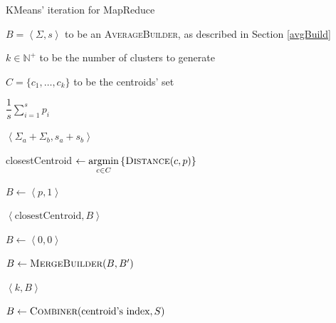 \documentclass[parskip=full]{report}
\begin{document}
\begin{algorithm}
	\caption{KMeans' iteration for MapReduce}
	\label{algo:kmeans-reducer}
	\begin{algorithmic}[1]
		\Require $B = \left\langle \Sigma, s\right\rangle$ to be an 
		\textsc{AverageBuilder}, as described in Section \ref{avgBuild}
		
		\Require $k \in \mathbb{N}^+$ to be the number of clusters to generate
		
		\Require $C = \{c_1, \dots, c_k\}$ to be the centroids' set
		
		 
		\State \Return $\dfrac{1}{s}\sum_{i = 1}^{s} p_i$
		\EndProcedure
		
		\vspace{.25cm}
		
		 
		\State \Return $\left\langle \Sigma_a + \Sigma_b, s_a + 
		s_b\right\rangle$
		\EndProcedure
		
		\vspace{.25cm}
		
		
		\State closestCentroid $\gets \underset{c \in C}{\mathrm{argmin}} 
		\left\{\Call{Distance}{c, p}\right\}$ 
		
		\State $B \gets \left\langle p, 1\right\rangle$ 
		
		\State \Return $\left\langle \text{closestCentroid}, B\right\rangle$
		
		\EndProcedure
		
		\vspace{.25cm}
		
		\State $B \gets \left\langle 0,0 \right\rangle$
		
		\State $B \gets \Call{MergeBuilder}{B, B'}$
		\EndFor
		
		\State \Return $\left\langle k, B\right\rangle$
		\EndProcedure
		
		\vspace{.25cm}
		
		\State $B \gets \Call{Combiner}{\text{centroid's index},S}$
		\State \Return {}
		\EndProcedure
	\end{algorithmic}
\end{algorithm}
\end{document}
